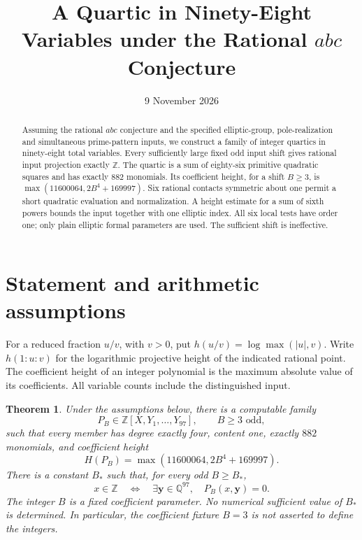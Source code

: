 \documentclass[11pt,a4paper]{article}
\title{A Quartic in Ninety-Eight Variables under the Rational $abc$ Conjecture}
\author{}\date{9 November 2026}
\newtheorem{theorem}{Theorem}[section]
\newcommand{\Q}{\mathbb Q}\newcommand{\Z}{\mathbb Z}
\begin{document}
\maketitle
\begin{abstract}
Assuming the rational $abc$ conjecture and the specified elliptic-group,
pole-realization and simultaneous prime-pattern inputs, we construct a
family of integer quartics in ninety-eight total variables. Every
sufficiently large fixed odd input shift gives rational input projection
exactly $\Z$. The quartic is a sum of eighty-six primitive quadratic
squares and has exactly $882$ monomials. Its coefficient height, for a
shift $B\ge3$, is $\max(11600064,2B^4+169997)$. Six rational contacts
symmetric about one permit a short quadratic evaluation and normalization.
A height estimate for a sum of sixth powers bounds the input together
with one elliptic index. All six local tests have order one; only plain
elliptic formal parameters are used. The sufficient shift is ineffective.
\end{abstract}

\section{Statement and arithmetic assumptions}

For a reduced fraction $u/v$, with $v>0$, put
$h(u/v)=\log\max(|u|,v)$. Write $h(1:u:v)$ for the logarithmic
projective height of the indicated rational point. The coefficient height
of an integer polynomial is the maximum absolute value of its coefficients.
All variable counts include the distinguished input.

\begin{theorem}\label{thm:main}
Under the assumptions below, there is a computable family
\[
 P_B\in\Z[X,Y_1,\ldots,Y_{97}],\qquad B\ge3\text{ odd},
\]
such that every member has degree exactly four, content one, exactly
$882$ monomials, and coefficient height
\[
 H(P_B)=\max(11600064,2B^4+169997).
\]
There is a constant $B_*$ such that, for every odd $B\ge B_*$,
\[
 x\in\Z\quad\Longleftrightarrow\quad
 \exists\boldsymbol y\in\Q^{97},\quad P_B(x,\boldsymbol y)=0.
\]
The integer $B$ is a fixed coefficient parameter. No numerical sufficient
value of $B_*$ is determined. In particular, the coefficient fixture
$B=3$ is not asserted to define the integers.
\end{theorem}
\end{document}
